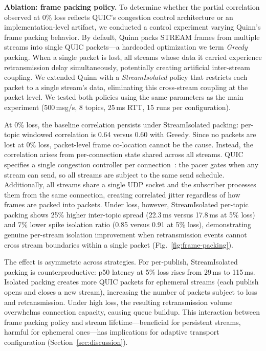 \textbf{Ablation: frame packing policy.} To determine whether the partial correlation observed at 0\% loss reflects QUIC's congestion control architecture or an implementation-level artifact, we conducted a control experiment varying Quinn's frame packing behavior. By default, Quinn packs STREAM frames from multiple streams into single QUIC packets---a hardcoded optimization we term \emph{Greedy} packing. When a single packet is lost, all streams whose data it carried experience retransmission delay simultaneously, potentially creating artificial inter-stream coupling. We extended Quinn with a \emph{StreamIsolated} policy that restricts each packet to a single stream's data, eliminating this cross-stream coupling at the packet level. We tested both policies using the same parameters as the main experiment (500\,msg/s, 8 topics, 25\,ms RTT, 15 runs per configuration).

At 0\% loss, the baseline correlation persists under StreamIsolated packing: per-topic windowed correlation is 0.64 versus 0.60 with Greedy. Since no packets are lost at 0\% loss, packet-level frame co-location cannot be the cause. Instead, the correlation arises from per-connection state shared across all streams. QUIC specifies a single congestion controller per connection~\cite{rfc9002, rfc9308}: the pacer gates when any stream can send, so all streams are subject to the same send schedule. Additionally, all streams share a single UDP socket and the subscriber processes them from the same connection, creating correlated jitter regardless of how frames are packed into packets. Under loss, however, StreamIsolated per-topic packing shows 25\% higher inter-topic spread (22.3\,ms versus 17.8\,ms at 5\% loss) and 7\% lower spike isolation ratio (0.85 versus 0.91 at 5\% loss), demonstrating genuine per-stream isolation improvement when retransmission events cannot cross stream boundaries within a single packet (Fig.~\ref{fig:frame-packing}).

The effect is asymmetric across strategies. For per-publish, StreamIsolated packing is counterproductive: p50 latency at 5\% loss rises from 29\,ms to 115\,ms. Isolated packing creates more QUIC packets for ephemeral streams (each publish opens and closes a new stream), increasing the number of packets subject to loss and retransmission. Under high loss, the resulting retransmission volume overwhelms connection capacity, causing queue buildup. This interaction between frame packing policy and stream lifetime---beneficial for persistent streams, harmful for ephemeral ones---has implications for adaptive transport configuration (Section~\ref{sec:discussion}).

